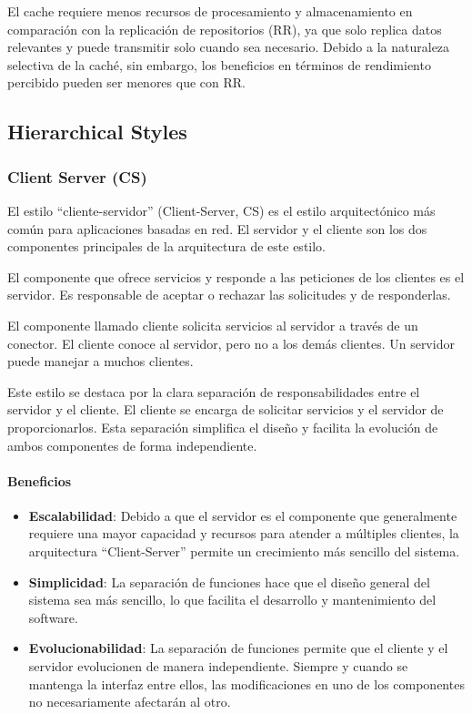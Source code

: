 \documentclass{article}
\begin{document}
		 El cache requiere menos recursos de procesamiento y almacenamiento en comparación con la replicación de repositorios (RR), ya que solo replica datos relevantes y puede transmitir solo cuando sea necesario. Debido a la naturaleza selectiva de la caché, sin embargo, los beneficios en términos de rendimiento percibido pueden ser menores que con RR.
		 
		 
		
		
		
		\subsection{Hierarchical Styles}
		
		\subsubsection{Client Server (CS)}
		El estilo ``cliente-servidor'' (Client-Server, CS) es el estilo arquitectónico más común para aplicaciones basadas en red. El servidor y el cliente son los dos componentes principales de la arquitectura de este estilo.
		
		El componente que ofrece servicios y responde a las peticiones de los clientes es el servidor. Es responsable de aceptar o rechazar las solicitudes y de responderlas.
		
		El componente llamado cliente solicita servicios al servidor a través de un conector. El cliente conoce al servidor, pero no a los demás clientes. Un servidor puede manejar a muchos clientes.
		
		 Este estilo se destaca por la clara separación de responsabilidades entre el servidor y el cliente. El cliente se encarga de solicitar servicios y el servidor de proporcionarlos. Esta separación simplifica el diseño y facilita la evolución de ambos componentes de forma independiente.
		
		\paragraph{Beneficios}
		\begin{itemize}	
			\item {\textbf{Escalabilidad}}: Debido a que el servidor es el componente que generalmente requiere una mayor capacidad y recursos para atender a múltiples clientes, la arquitectura ``Client-Server'' permite un crecimiento más sencillo del sistema.
			
			\item {\textbf{Simplicidad}}: La separación de funciones hace que el diseño general del sistema sea más sencillo, lo que facilita el desarrollo y mantenimiento del software.
			
			\item {\textbf{Evolucionabilidad}}: La separación de funciones permite que el cliente y el servidor evolucionen de manera independiente. Siempre y cuando se mantenga la interfaz entre ellos, las modificaciones en uno de los componentes no necesariamente afectarán al otro.
			
		\end{itemize}
		
\end{document}
